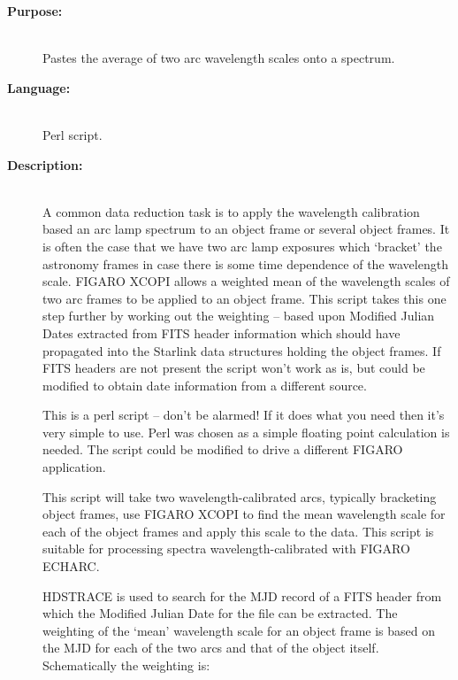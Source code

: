 \documentclass[twoside,11pt]{article}
\newcommand{\xref}[3]{#1}
\renewcommand{\_}{\texttt{\symbol{95}}}
\newcommand{\scspec}[2]{#1}
\newcommand{\scspec}[2]{#2}
\begin{document}
\begin{description}

\item [{\bf Purpose:}] \mbox{} \\
     Pastes the average of two arc wavelength scales onto a spectrum.

\item [{\bf Language:}] \mbox{} \\
     Perl script.

\item [{\bf Description:}] \mbox{} \\
     A common data reduction task is to apply the wavelength calibration
     based an arc lamp spectrum to an object frame or several object
     frames.  It is often the case that we have two arc lamp exposures which
     `bracket' the astronomy frames in case there is some time dependence
     of the wavelength scale.  \xref{FIGARO}{sun86}{}
     \xref{XCOPI}{sun86}{XCOPI} allows a weighted mean of the
     wavelength scales of two arc frames to be applied to an object frame.
     This script takes this one step further by working out the weighting
     \scspec{--}{-}
     based upon Modified Julian Dates extracted from FITS header
     information which should have propagated into the Starlink data
     structures holding the object frames.  If FITS headers are not present
     the script won't work as is, but could be modified to obtain date
     information from a different source.

     This is a perl script \scspec{--}{-} don't be alarmed!
     If it does what you need then it's very simple to use.
     Perl was chosen as a simple floating point calculation is needed.
     The script could be modified to drive a different FIGARO application.

     This script will take two wavelength-calibrated arcs, typically
     bracketing object frames, use FIGARO XCOPI to find the mean
     wavelength scale for each of the object frames and apply this
     scale to the data.  This script is suitable for processing spectra
     wavelength-calibrated with FIGARO \xref{ECHARC}{sun86}{ECHARC}.

     \xref{HDSTRACE}{sun102}{} is used to search for the MJD record of a
     FITS header from which the Modified Julian Date for the file can be
     extracted.  The weighting of the `mean' wavelength scale for an
     object frame is based on the MJD for each of the two arcs and that
     of the object itself.  Schematically the weighting is:


\end{description}
\end{document}
